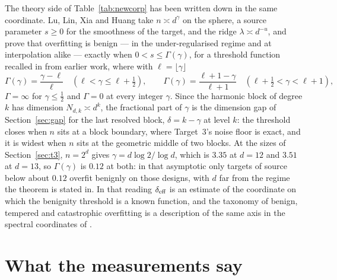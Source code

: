 \documentclass[11pt]{article}
\theoremstyle{definition}
\begin{document}
The theory side of Table~\ref{tab:newcorp} has been written down in the same coordinate. Lu, Lin,
Xia and Huang \cite{LuLinXiaHuang} take $n\asymp d^{\gamma}$ on the sphere, a source parameter
$s\ge0$ for the smoothness of the target, and the ridge $\lambda\asymp d^{-u}$, and prove that
overfitting is benign --- in the under-regularised regime and at interpolation alike --- exactly
when $0<s\le\Gamma(\gamma)$, for a threshold function recalled in \cite{LuLinXiaHuang} from earlier
work, where with $\ell=\lfloor\gamma\rfloor$
\[
\Gamma(\gamma)=\frac{\gamma-\ell}{\ell}\quad(\ell<\gamma\le\ell+\tfrac12),\qquad
\Gamma(\gamma)=\frac{\ell+1-\gamma}{\ell+1}\quad(\ell+\tfrac12<\gamma<\ell+1),
\]
$\Gamma=\infty$ for $\gamma\le\frac12$ and $\Gamma=0$ at every integer $\gamma$. Since the
harmonic block of degree $k$ has dimension $N_{d,k}\asymp d^k$, the fractional part of $\gamma$ is the
dimension gap of Section~\ref{sec:gap} for the last resolved block, $\delta=k-\gamma$ at level $k$: the
threshold closes when $n$ sits at a block boundary, where Target~3's noise floor is exact, and it is
widest when $n$ sits at the geometric middle of two blocks. At the sizes of Section~\ref{sec:t3},
$n=2^d$ gives $\gamma=d\log2/\log d$, which is $3.35$ at $d=12$ and $3.51$ at $d=13$, so
$\Gamma(\gamma)$ is $0.12$ at both: in that asymptotic only targets of source below about $0.12$
overfit benignly on those designs, with $d$ far from the regime the theorem is stated in. In that
reading $\delta_{\rm eff}$ is an estimate of the coordinate on which the benignity threshold is a
known function, and the taxonomy of benign, tempered and catastrophic overfitting \cite{Mallinar} is
a description of the same axis in the spectral coordinates of \cite{Cui}.

\section{What the measurements say}
\end{document}
